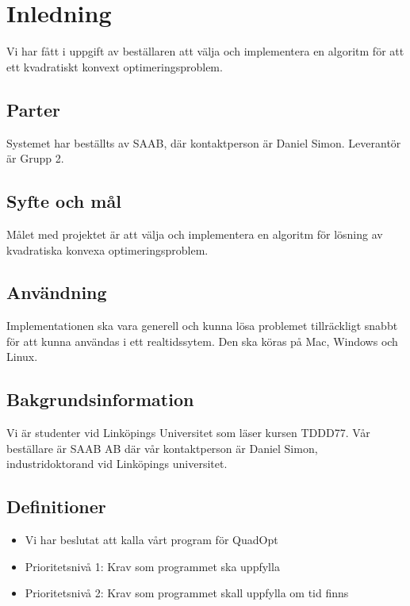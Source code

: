 \section{Inledning}
Vi har fått i uppgift av beställaren att välja och implementera en algoritm för att ett kvadratiskt konvext optimeringsproblem.

\subsection{Parter}
Systemet har beställts av SAAB, där kontaktperson är Daniel Simon. Leverantör är Grupp 2.

\subsection{Syfte och mål}
Målet med projektet är att välja och implementera en algoritm för lösning av kvadratiska konvexa optimeringsproblem. 

\subsection{Användning}
Implementationen ska vara generell och kunna lösa problemet tillräckligt snabbt för att kunna användas i ett realtidssytem. Den ska köras på Mac, Windows och Linux.
\subsection{Bakgrundsinformation}
Vi är studenter vid Linköpings Universitet som läser kursen TDDD77. Vår beställare är SAAB AB där vår kontaktperson är Daniel Simon, industridoktorand vid Linköpings universitet. 

\subsection{Definitioner}

\begin{itemize}
\item{Vi har beslutat att kalla vårt program för QuadOpt}
\item{Prioritetsnivå 1: Krav som programmet ska uppfylla}
\item{Prioritetsnivå 2: Krav som programmet skall uppfylla om tid finns}
\end{itemize}
